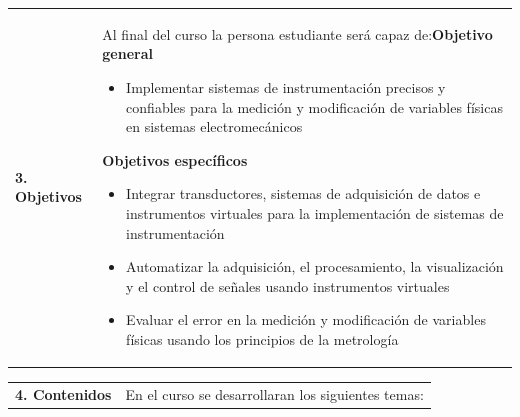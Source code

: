 \documentclass[letterpaper]{article}%
\begin{document}
\vspace*{4mm}%
\newline%
\begin{tabularx}{\textwidth}{p{3cm}p{13cm}}%
\par\fontsize{12}{14}\selectfont \textbf{\textcolor{parte}{3. Objetivos}}&Al final del curso la persona estudiante será capaz de:\newline\newline \textbf{Objetivo general}\begin{itemize}\item Implementar sistemas de instrumentación precisos y confiables para la medición y modificación de variables físicas en sistemas electromecánicos\end{itemize} \vspace{2mm}\textbf{Objetivos específicos}\begin{itemize}\item Integrar transductores, sistemas de adquisición de datos e instrumentos virtuales para la implementación de sistemas de instrumentación\item Automatizar la adquisición, el procesamiento, la visualización y el control de señales usando instrumentos virtuales\item Evaluar el error en la medición y modificación de variables físicas usando los principios de la metrología\end{itemize}\\%
\end{tabularx}%
\vspace*{4mm}%
\newline%
\begin{tabularx}{\textwidth}{p{3cm}p{13cm}}%
\par\fontsize{12}{14}\selectfont \textbf{\textcolor{parte}{4. Contenidos}}&En el curso se desarrollaran los siguientes temas:\\%
\end{tabularx}%
\newline%
\end{document}
